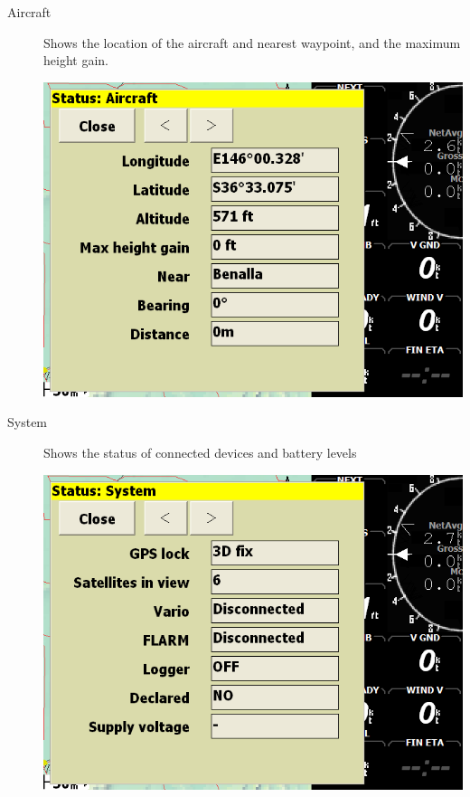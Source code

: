 \documentclass[a4paper,12pt]{refrep}
\begin{document}
\begin{description}
\item[Aircraft]  Shows the location of the aircraft and nearest waypoint,
  and the maximum height gain.
\begin{center}
\includegraphics[angle=0,width=\linewidth,keepaspectratio='true']{figures/status-aircraft.png}
\end{center}

\item[System]  Shows the status of connected devices and battery levels

\begin{center}
\includegraphics[angle=0,width=\linewidth,keepaspectratio='true']{figures/status-system.png}
\end{center}


\end{description}
\end{document}
